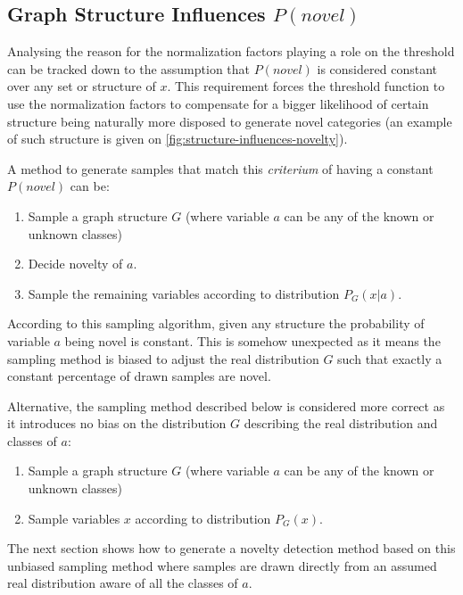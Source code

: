 \subsection{Graph Structure Influences $P(novel)$}
Analysing the reason for the normalization factors playing a role on the
threshold can be tracked down to the assumption that $P(novel)$ is
considered constant over any set or structure of $x$.
This requirement forces the threshold function to use the normalization factors
to compensate for a bigger likelihood of certain structure being naturally more
disposed to generate novel categories (an example of such structure is given on
\autoref{fig:structure-influences-novelty}).

A method to generate samples that match this \emph{criterium} of
having a constant $P(novel)$ can be:

\begin{algorithm}
\begin{enumerate}
\item Sample a graph structure $G$ (where variable $a$ can be any of the known or unknown classes)
\item Decide novelty of $a$.
\item Sample the remaining variables according to distribution $P_G(x|a)$.
\end{enumerate}
\end{algorithm}


According to this sampling algorithm, given any structure the probability of
variable $a$ being novel is constant. This is somehow unexpected as it means
the sampling method is biased to adjust the real distribution $G$ such that
exactly a constant percentage of drawn samples are novel.

Alternative, the sampling method described below is considered more correct as
it introduces no bias on the distribution $G$ describing the real distribution
and classes of $a$:
\begin{algorithm}
\begin{enumerate}
\item Sample a graph structure $G$ (where variable $a$ can be any of the known or unknown classes)
\item Sample variables $x$ according to distribution $P_G(x)$.
\end{enumerate}
\end{algorithm}

The next section shows how to generate a novelty detection method based on this
unbiased sampling method where samples are drawn directly from an assumed real
distribution aware of all the classes of $a$.

